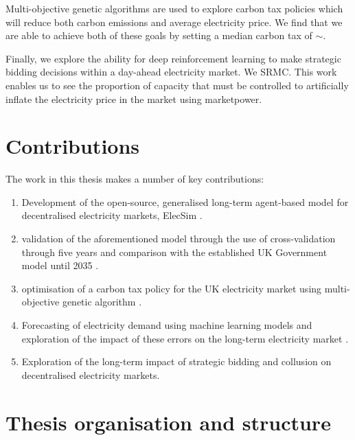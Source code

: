 Multi-objective genetic algorithms are used to explore carbon tax policies which will reduce both carbon emissions and average electricity price. We find that we are able to achieve both of these goals by setting a median carbon tax of ${\sim}$.

Finally, we explore the ability for deep reinforcement learning to make strategic bidding decisions within a day-ahead electricity market. We \gls{SRMC}. This work enables us to see the proportion of capacity that must be controlled to artificially inflate the electricity price in the market using \gls{marketpower}. 

\section{Contributions}

The work in this thesis makes a number of key contributions:

\begin{enumerate}
	\item Development of the open-source, generalised long-term agent-based model for decentralised electricity markets, ElecSim \cite{Kell}.
	\item validation of the aforementioned model through the use of cross-validation through five years and comparison with the established UK Government model until 2035 \cite{Kell2020}.
	\item optimisation of a carbon tax policy for the UK electricity market using multi-objective genetic algorithm \cite{Kell2020a}.
	\item Forecasting of electricity demand using machine learning models and exploration of the impact of these errors on the long-term electricity market \cite{Kell2018a}.
	\item Exploration of the long-term impact of strategic bidding and collusion on decentralised electricity markets.
\end{enumerate}

\section{Thesis organisation and structure}


